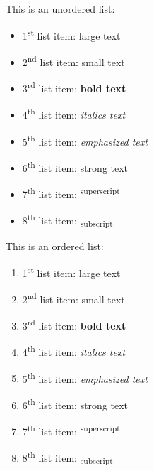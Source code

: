 \documentclass[12pt]{article}
\begin{document}
\begin{paragraph}
This is an unordered list:
\end{paragraph}
\begin{itemize}
    \item 1\textsuperscript{st} list item: {\Large large text}
    \item 2\textsuperscript{nd} list item: {\scriptsize small text}
    \item 3\textsuperscript{rd} list item: \textbf{bold text}
    \item 4\textsuperscript{th} list item: \textit{italics text}
    \item 5\textsuperscript{th} list item: \emph{emphasized text}
    \item 6\textsuperscript{th} list item: \textmd{strong text}
    \item 7\textsuperscript{th} list item: \textsuperscript{superscript}
    \item 8\textsuperscript{th} list item: \textsubscript{subscript}
\end{itemize}
\begin{paragraph}
This is an ordered list:
\end{paragraph}
\begin{enumerate}
    \item 1\textsuperscript{st} list item: {\Large large text}
    \item 2\textsuperscript{nd} list item: {\scriptsize small text}
    \item 3\textsuperscript{rd} list item: \textbf{bold text}
    \item 4\textsuperscript{th} list item: \textit{italics text}
    \item 5\textsuperscript{th} list item: \emph{emphasized text}
    \item 6\textsuperscript{th} list item: \textmd{strong text}
    \item 7\textsuperscript{th} list item: \textsuperscript{superscript}
    \item 8\textsuperscript{th} list item: \textsubscript{subscript}
\end{enumerate}%
\end{document}
